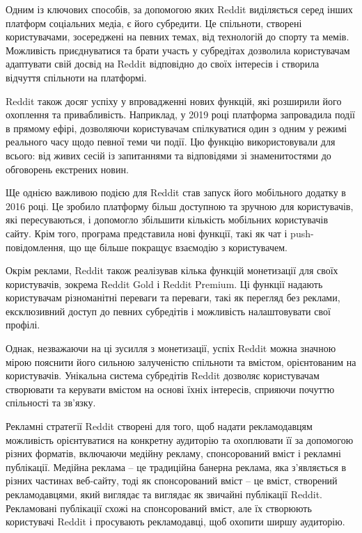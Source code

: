 \documentclass[oneside,14pt]{extarticle}
\begin{document}
Одним із ключових способів, за допомогою яких Reddit виділяється серед інших платформ соціальних медіа, є його субредити. Це спільноти, створені користувачами, зосереджені на певних темах, від технологій до спорту та мемів. Можливість приєднуватися та брати участь у субредітах дозволила користувачам адаптувати свій досвід на Reddit відповідно до своїх інтересів і створила відчуття спільноти на платформі.

Reddit також досяг успіху у впровадженні нових функцій, які розширили його охоплення та привабливість. Наприклад, у 2019 році платформа запровадила події в прямому ефірі, дозволяючи користувачам спілкуватися один з одним у режимі реального часу щодо певної теми чи події. Цю функцію використовували для всього: від живих сесій із запитаннями та відповідями зі знаменитостями до обговорень екстрених новин.

Ще однією важливою подією для Reddit став запуск його мобільного додатку в 2016 році. Це зробило платформу більш доступною та зручною для користувачів, які пересуваються, і допомогло збільшити кількість мобільних користувачів сайту. Крім того, програма представила нові функції, такі як чат і push-повідомлення, що ще більше покращує взаємодію з користувачем.

Окрім реклами, Reddit також реалізував кілька функцій монетизації для своїх користувачів, зокрема Reddit Gold і Reddit Premium. Ці функції надають користувачам різноманітні переваги та переваги, такі як перегляд без реклами, ексклюзивний доступ до певних субредітів і можливість налаштовувати свої профілі.

Однак, незважаючи на ці зусилля з монетизації, успіх Reddit можна значною мірою пояснити його сильною залученістю спільноти та вмістом, орієнтованим на користувачів. Унікальна система субредітів Reddit дозволяє користувачам створювати та керувати вмістом на основі їхніх інтересів, сприяючи почуттю спільності та зв’язку.

Рекламні стратегії Reddit створені для того, щоб надати рекламодавцям можливість орієнтуватися на конкретну аудиторію та охоплювати її за допомогою різних форматів, включаючи медійну рекламу, спонсорований вміст і рекламні публікації. Медійна реклама – це традиційна банерна реклама, яка з’являється в різних частинах веб-сайту, тоді як спонсорований вміст – це вміст, створений рекламодавцями, який виглядає та виглядає як звичайні публікації Reddit. Рекламовані публікації схожі на спонсорований вміст, але їх створюють користувачі Reddit і просувають рекламодавці, щоб охопити ширшу аудиторію.
\end{document}
